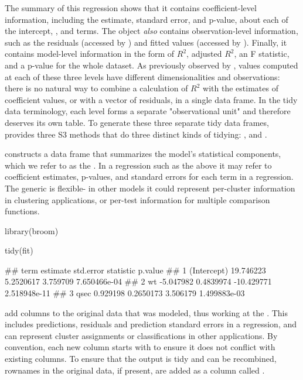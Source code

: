 The summary of this regression shows that it contains coefficient-level information, including the estimate, standard error, and p-value, about each of the intercept, , and  terms. The  object \emph{also} contains observation-level information, such as the residuals (accessed by ) and fitted values (accessed by ). Finally, it contains model-level information in the form of $R^2$, adjusted $R^2$, an F statistic, and a p-value for the whole dataset. As previously observed by \citet{Wickham:2007}, values computed at each of these three levels have different dimensionalities and observations: there is no natural way to combine a calculation of $R^2$ with the estimates of coefficient values, or with a vector of residuals, in a single data frame. In the tidy data terminology, each level forms a separate "observational unit" and therefore deserves its own table. To generate these three separate tidy data frames,  provides three S3 methods that do three distinct kinds of tidying: ,  and .

 constructs a data frame that summarizes the model's statistical components, which we refer to as the . In a regression such as the above it may refer to coefficient estimates, p-values, and standard errors for each term in a regression. The  generic is flexible- in other models it could represent per-cluster information in clustering applications, or per-test information for multiple comparison functions.


\begin{example}
library(broom)
\end{example}

\begin{example}
tidy(fit)
\end{example}

\begin{example}
##          term  estimate std.error  statistic      p.value
## 1 (Intercept) 19.746223 5.2520617   3.759709 7.650466e-04
## 2          wt -5.047982 0.4839974 -10.429771 2.518948e-11
## 3        qsec  0.929198 0.2650173   3.506179 1.499883e-03

\end{example}


 add columns to the original data that was modeled, thus working at the . This includes predictions, residuals and prediction standard errors in a regression, and can represent cluster assignments or classifications in other applications. By convention, each new column starts with  to ensure it does not conflict with existing columns. To ensure that the output is tidy and can be recombined, rownames in the original data, if present, are added as a column called .


